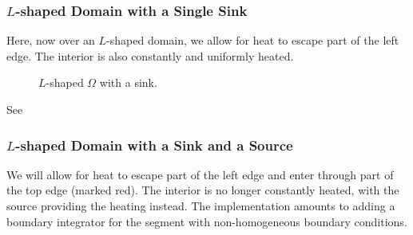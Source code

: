 \vfill\pagebreak

\subsubsection{$L$-shaped Domain with a Single Sink}

Here, now over an $L$-shaped domain, we allow for heat to escape part of the left edge. The interior is
also constantly and uniformly heated.

\begin{figure}[H]
    \centering
    \caption[b]{$L$-shaped $\Omega$ with a sink.}
\end{figure}

See

\subsubsection{$L$-shaped Domain with a Sink and a Source}

We will allow for heat to escape part of the left edge and enter through part of the top edge (marked red). The interior is no
longer constantly heated, with the source providing the heating instead. The implementation amounts to adding a boundary integrator
for the segment with non-homogeneous boundary conditions.


